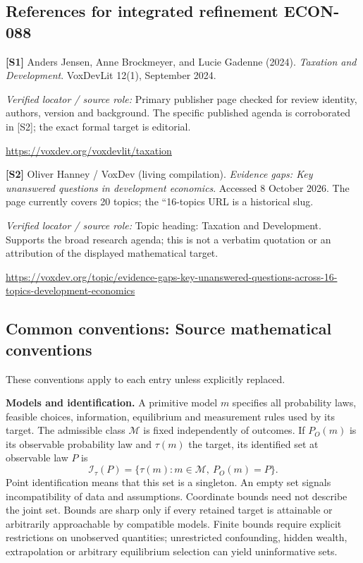 \documentclass[11pt,a4paper]{article}
\begin{document}
\subsection*{References for integrated refinement ECON-088}
{\footnotesize\raggedright
\par\noindent\textbf{[S1]} Anders Jensen, Anne Brockmeyer, and Lucie Gadenne (2024). \emph{Taxation and Development}. VoxDevLit 12(1), September 2024.\par \textit{Verified locator / source role:} Primary publisher page checked for review identity, authors, version and background. The specific published agenda is corroborated in [S2]; the exact formal target is editorial.\par \url{https://voxdev.org/voxdevlit/taxation}\par\smallskip
\par\noindent\textbf{[S2]} Oliver Hanney / VoxDev (living compilation). \emph{Evidence gaps: Key unanswered questions in development economics}. Accessed 8 October 2026. The page currently covers 20 topics; the ``16-topics URL is a historical slug.\par \textit{Verified locator / source role:} Topic heading: Taxation and Development. Supports the broad research agenda; this is not a verbatim quotation or an attribution of the displayed mathematical target.\par \url{https://voxdev.org/topic/evidence-gaps-key-unanswered-questions-across-16-topics-development-economics}\par\smallskip
}

\subsection*{Common conventions: Source mathematical conventions}

These conventions apply to each entry unless explicitly replaced.

\textbf{Models and identification.} A primitive model \(m\) specifies all probability laws, feasible choices, information, equilibrium and measurement rules used by its target. The admissible class \(\mathcal M\) is fixed independently of outcomes. If \(P_O(m)\) is its observable probability law and \(\tau(m)\) the target, its identified set at observable law \(P\) is
\[
 \mathcal I_\tau(P)=\{\tau(m):m\in\mathcal M,\ P_O(m)=P\}.
\]
Point identification means that this set is a singleton. An empty set signals incompatibility of data and assumptions. Coordinate bounds need not describe the joint set. Bounds are sharp only if every retained target is attainable or arbitrarily approachable by compatible models. Finite bounds require explicit restrictions on unobserved quantities; unrestricted confounding, hidden wealth, extrapolation or arbitrary equilibrium selection can yield uninformative sets.
\end{document}
